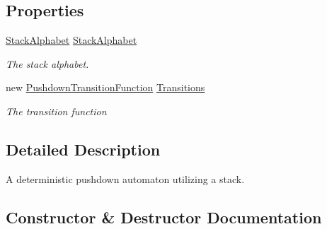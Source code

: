 \subsection*{Properties}
\begin{DoxyCompactItemize}
\item 
\mbox{\hyperlink{class_system_1_1_automata_1_1_stack_alphabet}{Stack\+Alphabet}} \mbox{\hyperlink{class_system_1_1_automata_1_1_pushdown_automaton_ac6e0b6accb2e2da48f0d6b4179714e15}{Stack\+Alphabet}}
\begin{DoxyCompactList}\small\item\em The stack alphabet. \end{DoxyCompactList}\item 
new \mbox{\hyperlink{class_system_1_1_automata_1_1_pushdown_transition_function}{Pushdown\+Transition\+Function}} \mbox{\hyperlink{class_system_1_1_automata_1_1_pushdown_automaton_a2f4b67078bb3b628ff512fc5db396269}{Transitions}}
\begin{DoxyCompactList}\small\item\em The transition function \end{DoxyCompactList}\end{DoxyCompactItemize}


\subsection{Detailed Description}
A deterministic pushdown automaton utilizing a stack. 



\subsection{Constructor \& Destructor Documentation}
\mbox{\label{class_system_1_1_automata_1_1_pushdown_automaton_a5cfa8067f1080fe92500ed5eb4edf147}} 
